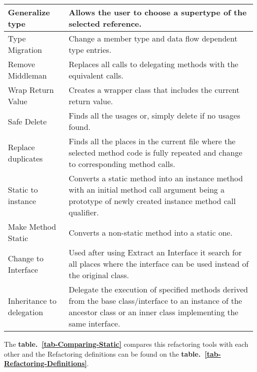 \begin{table}[htbp]
\begin{tabular}{ p{2.95cm}| p{9.15cm}}
Generalize type           & Allows the user to choose a supertype of the selected reference.                                                                                                          \\ \hline
Type Migration            & Change a member type and data flow dependent type entries.                                                                                                                \\ \hline
Remove Middleman          & Replaces all calls to delegating methods with the equivalent calls.                                                                                                       \\ \hline
Wrap Return Value         & Creates a wrapper class that includes the current return value.                                                                                                           \\ \hline
Safe Delete               & Finds all the usages or, simply delete if no usages found.                                                                                                                \\ \hline
Replace duplicates        & Finds all the places in the current file where the selected method code is fully repeated and change to corresponding method calls.                                      \\ \hline
Static to instance        & Converts a static method into an instance method with an initial method call argument being a prototype of newly created instance method call qualifier.                  \\ \hline
Make Method Static        & Converts a non-static method into a static one.                                                                                                                           \\ \hline
Change to Interface       & Used after using Extract an Interface it search for all places where the interface can be used instead of the original class.                                             \\ \hline
Inheritance to delegation & Delegate the execution of specified methods derived from the base class/interface to an instance of the ancestor class or an inner class implementing the same interface. \\ \hline
\end{tabular}
\end{table}
The {\bf table.~\ref{tab-Comparing-Static}} compares this refactoring tools with each other and the Refactoring definitions can be found on the {\bf table.~\ref{tab-Refactoring-Definitions}}.

